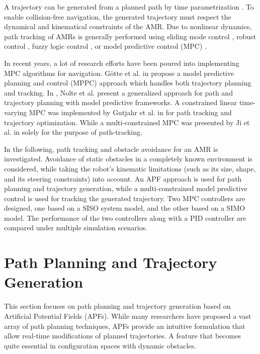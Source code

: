 \documentclass[a4paper, twocolumn]{article}
\begin{document}
A trajectory can be generated from a planned path by time parametrization \cite{roesmann1}. 
To enable collision-free navigation, the generated trajectory must respect the dynamical and kinematical constraints of the AMR.
Due to nonlinear dynamics, path tracking of AMRs is generally performed using sliding mode control \cite{yang1}, 
robust control \cite{normey-rico1}, fuzzy logic control \cite{antonelli1}, or model predictive control (MPC) \cite{ji1}.

In recent years, a lot of research efforts have been poured into implementing MPC algorithms for navigation.
Götte et al. in \cite{goette1} propose a model predictive planning and control (MPPC) approach which handles both trajectory planning and tracking.
In \cite{nolte1}, Nolte et al. present a generalized approach for path and trajectory planning with model predictive frameworks.
A constrained linear time-varying MPC was implemented by Gutjahr et al. in \cite{gutjahr1} for path tracking and trajectory optimization.
While a multi-constrained MPC was presented by Ji et al. in \cite{ji1} solely for the purpose of path-tracking.

In the following, path tracking and obstacle avoidance for an AMR is investigated.
Avoidance of static obstacles in a completely known environment is considered, while taking the robot’s kinematic limitations 
(such as its size, shape, and its steering constraints) into account.
An APF approach is used for path planning and trajectory generation, 
while a multi-constrained model predictive control is used for tracking the generated trajectory. 
Two MPC controllers are designed, one based on a SISO system model, and the other based on a SIMO model. 
The performance of the two controllers along with a PID controller are compared under multiple simulation scenarios.


\section{Path Planning and Trajectory Generation}
This section focuses on path planning and trajectory generation based on Artificial Potential Fields (APFs).
While many researchers have proposed a vast array of path planning techniques, APFs provide an intuitive formulation that 
allow real-time modifications of planned trajectories. A feature that becomes quite essential in configuration spaces with dynamic obstacles.
\end{document}
